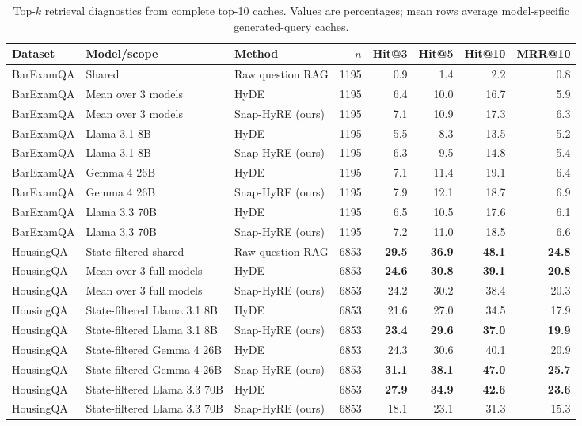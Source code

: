 \begin{table}[H]
\centering
\caption{Top-$k$ retrieval diagnostics from complete top-10 caches. Values are percentages; mean rows average model-specific generated-query caches.}
\label{tab:topk_retrieval}
\footnotesize
\begin{tabular}{lllrrrrr}
\toprule
Dataset & Model/scope & Method & $n$ & Hit@3 & Hit@5 & Hit@10 & MRR@10 \\
\midrule
BarExamQA & Shared & Raw question RAG & 1195 & 0.9 & 1.4 & 2.2 & 0.8 \\
BarExamQA & Mean over 3 models & HyDE & 1195 & 6.4 & 10.0 & 16.7 & 5.9 \\
BarExamQA & Mean over 3 models & Snap-HyRE (ours) & 1195 & 7.1 & 10.9 & 17.3 & 6.3 \\
BarExamQA & Llama 3.1 8B & HyDE & 1195 & 5.5 & 8.3 & 13.5 & 5.2 \\
BarExamQA & Llama 3.1 8B & Snap-HyRE (ours) & 1195 & 6.3 & 9.5 & 14.8 & 5.4 \\
BarExamQA & Gemma 4 26B & HyDE & 1195 & 7.1 & 11.4 & 19.1 & 6.4 \\
BarExamQA & Gemma 4 26B & Snap-HyRE (ours) & 1195 & 7.9 & 12.1 & 18.7 & 6.9 \\
BarExamQA & Llama 3.3 70B & HyDE & 1195 & 6.5 & 10.5 & 17.6 & 6.1 \\
BarExamQA & Llama 3.3 70B & Snap-HyRE (ours) & 1195 & 7.2 & 11.0 & 18.5 & 6.6 \\
\addlinespace
HousingQA & State-filtered shared & Raw question RAG & 6853 & \textbf{29.5} & \textbf{36.9} & \textbf{48.1} & \textbf{24.8} \\
HousingQA & Mean over 3 full models & HyDE & 6853 & \textbf{24.6} & \textbf{30.8} & \textbf{39.1} & \textbf{20.8} \\
HousingQA & Mean over 3 full models & Snap-HyRE (ours) & 6853 & 24.2 & 30.2 & 38.4 & 20.3 \\
HousingQA & State-filtered Llama 3.1 8B & HyDE & 6853 & 21.6 & 27.0 & 34.5 & 17.9 \\
HousingQA & State-filtered Llama 3.1 8B & Snap-HyRE (ours) & 6853 & \textbf{23.4} & \textbf{29.6} & \textbf{37.0} & \textbf{19.9} \\
HousingQA & State-filtered Gemma 4 26B & HyDE & 6853 & 24.3 & 30.6 & 40.1 & 20.9 \\
HousingQA & State-filtered Gemma 4 26B & Snap-HyRE (ours) & 6853 & \textbf{31.1} & \textbf{38.1} & \textbf{47.0} & \textbf{25.7} \\
HousingQA & State-filtered Llama 3.3 70B & HyDE & 6853 & \textbf{27.9} & \textbf{34.9} & \textbf{42.6} & \textbf{23.6} \\
HousingQA & State-filtered Llama 3.3 70B & Snap-HyRE (ours) & 6853 & 18.1 & 23.1 & 31.3 & 15.3 \\
\bottomrule
\end{tabular}
\end{table}
